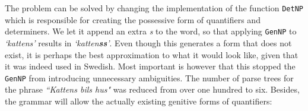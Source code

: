 \documentclass{report}
\begin{document}
The problem can be solved by changing the implementation of the function
\verb-DetNP-  which is responsible for creating the possessive form
of quantifiers and determiners.
We let it append an extra
\emph{s} to the word, so that applying \verb-GenNP- to \emph{`kattens'} results
in \emph{`katten\textbf{ss}'}. Even though this generates a form that does not exist, it is perhaps
the best approximation to what it would look like, given that it was indeed used in 
Swedish. Most important is however that this stopped the \verb-GenNP-
from introducing unnecessary ambiguities.
The number of parse trees for the phrase \emph{``Kattens bils hus"} was reduced
from over one hundred to six.
Besides, the grammar will allow the actually existing genitive
forms of quantifiers:



\end{document}

